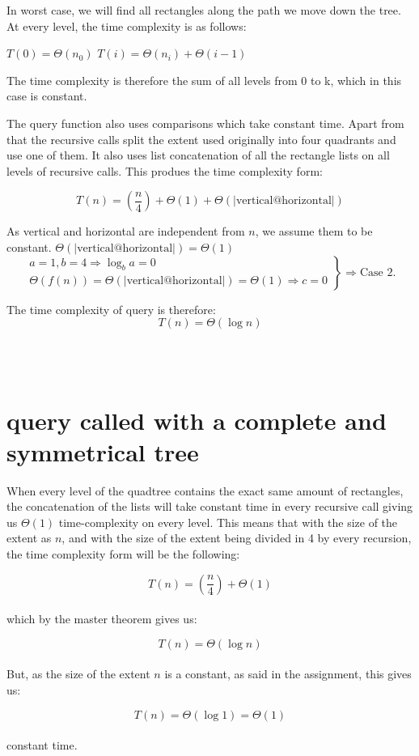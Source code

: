 \documentclass[12pt, a4paper]{article}
\begin{document}
In worst case, we will find all rectangles along the path we move down the tree. At every level, the time complexity is as follows: 

$T(0)= \Theta(n_0)$
$T(i)= \Theta(n_i) + \Theta(i-1)$

The time complexity is therefore the sum of all levels from 0 to k, which in this case is constant.



The query function also uses comparisons which take constant time. Apart from that the recursive calls split the extent used originally into four quadrants and use one of them. It also uses list concatenation of all the rectangle lists on all levels of recursive calls. This produes the time complexity form:

$$T(n)=\left(\frac{n}{4}\right)+\Theta(1)+\Theta(|\text{vertical@horizontal}|)$$

As vertical and horizontal are independent from $n$, we assume them to be constant. $\Theta(|\text{vertical@horizontal}|) = \Theta(1)$\\

\[
\left.
\begin{array}{l}
  a=1, b=4 \Rightarrow \log_ba = 0 \\
  \Theta(f(n)) = \Theta(|\text{vertical@horizontal}|) = \Theta(1) \Rightarrow c = 0
\end{array} \right\} \Rightarrow \text{Case 2.}
\]

The time complexity of query is therefore: $$T(n)=\Theta(\log n)$$

\\
\\
\section{query called with a complete and symmetrical tree}

When every level of the quadtree contains the exact same amount of rectangles, the concatenation of the lists will take constant time in every recursive call giving us $\Theta(1)$ time-complexity on every level. This means that with the size of the extent as $n$, and with the size of the extent being divided in 4 by every recursion, the time complexity form will be the following:

 $$T(n)=\left(\frac{n}{4}\right)+\Theta(1)$$\\

which by the master theorem gives us:

 $$T(n)=\Theta(\log n)$$\\

But, as the size of the extent $n$ is a constant, as said in the assignment, this gives us:

 $$T(n)=\Theta(\log 1)=\Theta(1)$$\\

constant time.
\end{document}
